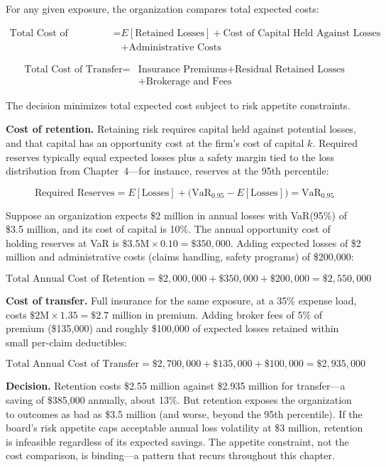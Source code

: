 \documentclass[11pt,openany]{book}
\begin{document}
For any given exposure, the organization compares total expected costs:

\begin{align*}
\text{Total Cost of Retention} ={}& E[\text{Retained Losses}]
+ \text{Cost of Capital Held Against Losses} \\
&+ \text{Administrative Costs}
\end{align*}

\begin{align*}
\text{Total Cost of Transfer} ={}& \text{Insurance Premiums}
+ \text{Residual Retained Losses} \\
&+ \text{Brokerage and Fees}
\end{align*}

The decision minimizes total expected cost subject to risk appetite
constraints.

\textbf{Cost of retention.} Retaining risk requires capital held against
potential losses, and that capital has an opportunity cost at the firm's cost
of capital \(k\). Required reserves typically equal expected losses plus a
safety margin tied to the loss distribution from
Chapter~4---for instance, reserves at the 95th
percentile:

\[
\text{Required Reserves} = E[\text{Losses}]
+ \big(\text{VaR}_{0.95} - E[\text{Losses}]\big) = \text{VaR}_{0.95}
\]

Suppose an organization expects \$2 million in annual losses with VaR(95\%)
of \$3.5 million, and its cost of capital is 10\%. The annual opportunity
cost of holding reserves at VaR is \(\$3.5\text{M} \times 0.10 =
\$350{,}000\). Adding expected losses of \$2 million and administrative costs
(claims handling, safety programs) of \$200,000:

\[
\text{Total Annual Cost of Retention}
= \$2{,}000{,}000 + \$350{,}000 + \$200{,}000 = \$2{,}550{,}000
\]

\textbf{Cost of transfer.} Full insurance for the same exposure, at a 35\%
expense load, costs \(\$2\text{M} \times 1.35 = \$2.7\) million in premium.
Adding broker fees of 5\% of premium (\$135,000) and roughly \$100,000 of
expected losses retained within small per-claim deductibles:

\[
\text{Total Annual Cost of Transfer}
= \$2{,}700{,}000 + \$135{,}000 + \$100{,}000 = \$2{,}935{,}000
\]

\textbf{Decision.} Retention costs \$2.55 million against \$2.935 million for
transfer---a saving of \$385,000 annually, about 13\%. But retention exposes
the organization to outcomes as bad as \$3.5 million (and worse, beyond the
95th percentile). If the board's risk appetite caps acceptable annual loss
volatility at \$3 million, retention is infeasible regardless of its expected
savings. The appetite constraint, not the cost comparison, is binding---a
pattern that recurs throughout this chapter.
\end{document}
